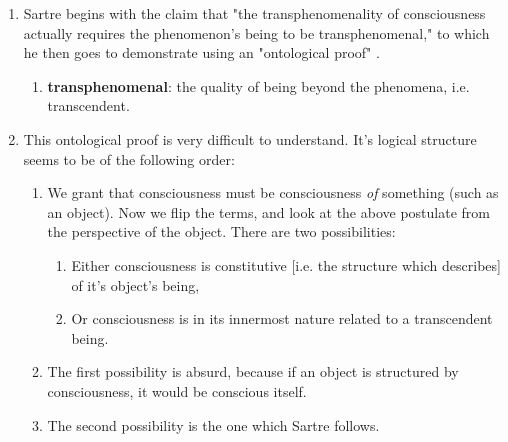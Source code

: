 \begin{enumerate}
  \item Sartre begins with the claim that "the transphenomenality of consciousness actually requires the phenomenon's being to be transphenomenal," to which he then goes to demonstrate using an "ontological proof" \autocite[20]{sartre}.
  \begin{enumerate}
    \item \textbf{transphenomenal}: the quality of being beyond the phenomena, i.e. transcendent.
  \end{enumerate}
  \item This ontological proof is very difficult to understand. It's logical structure seems to be of the following order:
  \begin{enumerate}
    \item We grant that consciousness must be consciousness \emph{of} something (such as an object). Now we flip the terms, and look at the above postulate from the perspective of the object. There are two possibilities:
    \begin{enumerate}
      \item Either consciousness is constitutive [i.e. the structure which describes] of it's object's being,
      \item Or consciousness is in its innermost nature related to a transcendent being.
    \end{enumerate}
    \item The first possibility is absurd, because if an object is structured by consciousness, it would be conscious itself.
    \item The second possibility is the one which Sartre follows.
  \end{enumerate}

\end{enumerate}
